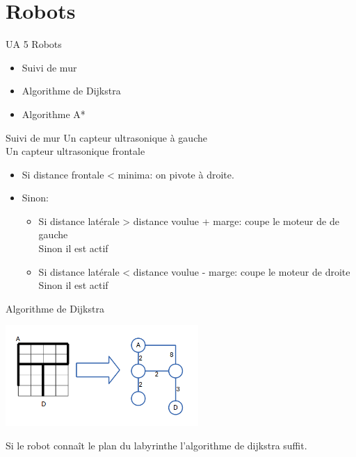 \documentclass{beamer}
\begin{document}
\section{Robots}
  \begin{frame}{UA 5 Robots}
      \begin{itemize}
          \item Suivi de mur
          \item Algorithme de Dijkstra
          \item Algorithme A*
      \end{itemize}
  \end{frame}
  \begin{frame}{Suivi de mur}
    Un capteur ultrasonique à gauche \\
    Un capteur ultrasonique frontale \\[1 cm]
    \begin{itemize}
      \item Si distance frontale < minima: on pivote à droite.
      \item Sinon:
      \begin{itemize}
        \item Si distance latérale > distance voulue + marge: coupe le moteur
        de de gauche \\Sinon il est actif \item Si distance latérale < distance
          voulue - marge: coupe le moteur de droite \\Sinon il est actif
      \end{itemize}
    \end{itemize}
  \end{frame}

  \begin{frame}{Algorithme de Dijkstra}
    \begin{center}
      \includegraphics[width=0.55\textwidth]{jeux/GRO_graph1} \\
    \end{center}
    Si le robot connaît le plan du labyrinthe l'algorithme de dijkstra suffit. 
  \end{frame}
\end{document}
